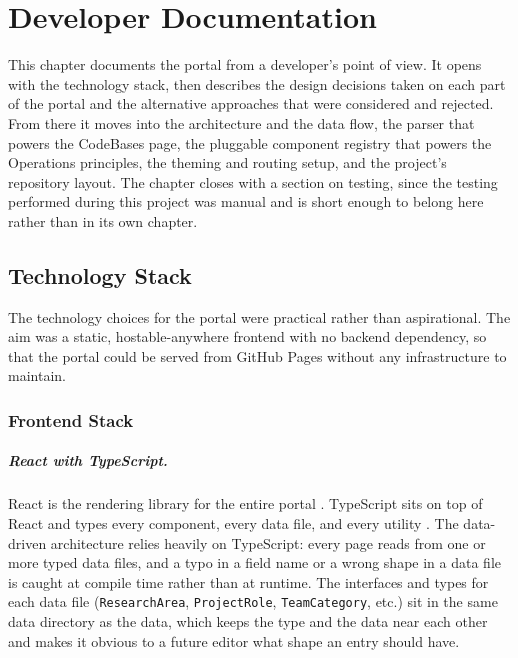 \chapter{Developer Documentation}\label{ch:dev}

This chapter documents the portal from a developer's point of view. It opens with the technology stack, then describes the design decisions taken on each part of the portal and the alternative approaches that were considered and rejected. From there it moves into the architecture and the data flow, the parser that powers the CodeBases page, the pluggable component registry that powers the Operations principles, the theming and routing setup, and the project's repository layout. The chapter closes with a section on testing, since the testing performed during this project was manual and is short enough to belong here rather than in its own chapter.

\section{Technology Stack}\label{sec:dev-stack}

The technology choices for the portal were practical rather than aspirational. The aim was a static, hostable-anywhere frontend with no backend dependency, so that the portal could be served from GitHub Pages without any infrastructure to maintain.

\subsection{Frontend Stack}\label{subsec:dev-stack-frontend}

\paragraph{React with TypeScript.}
React is the rendering library for the entire portal \cite{react}. TypeScript sits on top of React and types every component, every data file, and every utility \cite{typescript}. The data-driven architecture relies heavily on TypeScript: every page reads from one or more typed data files, and a typo in a field name or a wrong shape in a data file is caught at compile time rather than at runtime. The interfaces and types for each data file (\texttt{ResearchArea}, \texttt{ProjectRole}, \texttt{TeamCategory}, etc.) sit in the same data directory as the data, which keeps the type and the data near each other and makes it obvious to a future editor what shape an entry should have.

